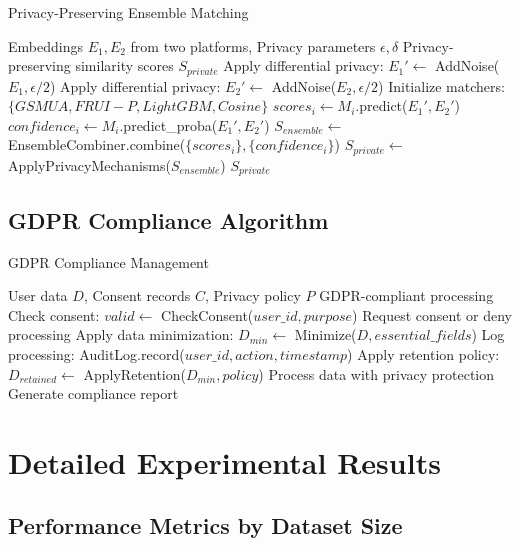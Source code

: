 \documentclass[conference]{IEEEtran}
\begin{document}
\begin{algorithm}
\caption{Privacy-Preserving Ensemble Matching}
\label{alg:ensemble_matching}
\begin{algorithmic}[1]
\REQUIRE Embeddings $E_1, E_2$ from two platforms, Privacy parameters $\epsilon, \delta$
\ENSURE Privacy-preserving similarity scores $S_{private}$
\STATE Apply differential privacy: $E_1' \leftarrow$ AddNoise($E_1, \epsilon/2$)
\STATE Apply differential privacy: $E_2' \leftarrow$ AddNoise($E_2, \epsilon/2$)
\STATE Initialize matchers: $\{GSMUA, FRUI-P, LightGBM, Cosine\}$
    \STATE $scores_i \leftarrow M_i$.predict($E_1', E_2'$)
    \STATE $confidence_i \leftarrow M_i$.predict\_proba($E_1', E_2'$)
\ENDFOR
\STATE $S_{ensemble} \leftarrow$ EnsembleCombiner.combine($\{scores_i\}, \{confidence_i\}$)
\STATE $S_{private} \leftarrow$ ApplyPrivacyMechanisms($S_{ensemble}$)
\RETURN $S_{private}$
\end{algorithmic}
\end{algorithm}

\subsection{GDPR Compliance Algorithm}

\begin{algorithm}
\caption{GDPR Compliance Management}
\label{alg:gdpr_compliance}
\begin{algorithmic}[1]
\REQUIRE User data $D$, Consent records $C$, Privacy policy $P$
\ENSURE GDPR-compliant processing
\STATE Check consent: $valid \leftarrow$ CheckConsent($user\_id, purpose$)
    \STATE Request consent or deny processing
    \RETURN
\ENDIF
\STATE Apply data minimization: $D_{min} \leftarrow$ Minimize($D, essential\_fields$)
\STATE Log processing: AuditLog.record($user\_id, action, timestamp$)
\STATE Apply retention policy: $D_{retained} \leftarrow$ ApplyRetention($D_{min}, policy$)
\STATE Process data with privacy protection
\STATE Generate compliance report
\end{algorithmic}
\end{algorithm}

\section{Detailed Experimental Results}

\subsection{Performance Metrics by Dataset Size}
\end{document}
